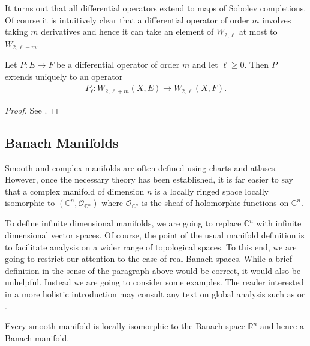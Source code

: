 \documentclass[12pt]{ociamthesis}  %
\begin{document}
It turns out that all differential operators extend to maps of Sobolev
completions. Of course it is intuitively clear that a differential
operator of order $m$ involves taking $m$ derivatives and hence
it can take an element of $W_{2,\ell}$ at most to $W_{2,\ell-m}$.

\begin{theorem}
  Let $P:E\to F$ be a differential operator of order $m$ and
  let $\ell \geq 0$. Then $P$ extends uniquely to an operator
  \begin{align}\label{eq:fredholm_extension}
    P_\ell : W_{2,\ell+m}(X,E) \to W_{2,\ell}(X,F).
  \end{align}
  \begin{proof}
    See \cite[{Proposition 3.8.4}]{bc2009}.
  \end{proof}
\end{theorem}

\subsection{Banach Manifolds}

Smooth and complex manifolds are often defined using charts and
atlases. However, once the necessary theory has been established,
it is far easier to say that a complex manifold
of dimension $n$ is a locally ringed space locally isomorphic to
$(\mathbb{C}^n,\mathcal O_{\mathbb{C}^n})$ where
$\mathcal O_{\mathbb{C}^n}$ is the sheaf of holomorphic functions on
$\mathbb{C}^n$.

To define infinite dimensional manifolds, we are going to replace
$\mathbb{C}^n$ with infinite dimensional vector spaces. Of course,
the point of the usual manifold definition is to facilitate analysis
on a wider range of topological spaces. To this end, we are going to
restrict our attention to the case of real Banach spaces. While a brief
definition in the sense of the paragraph above would be correct,
it would also be unhelpful. Instead we are going to consider some
examples. The reader interested in a more holistic
introduction may consult any text on global analysis such
as \cite[Chapter 7]{kahn1982} or \cite{bc2009}.

\begin{example}
  Every smooth manifold is locally isomorphic to
  the Banach space $\mathbb R^n$ and hence a Banach manifold.
\end{example}
\end{document}
